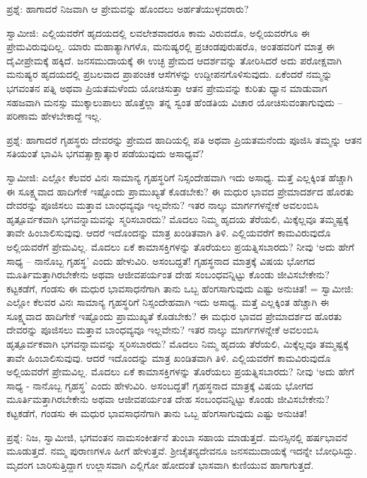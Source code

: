 ಪ್ರಶ್ನೆ: ಹಾಗಾದರೆ ನಿಜವಾಗಿ ಆ ಪ್ರೇಮವನ್ನು ಹೊಂದಲು ಅರ್ಹತೆಯುಳ್ಳವರಾರು?

ಸ್ವಾಮೀಜಿ: ಎಲ್ಲಿಯವರೆಗೆ ಹೃದಯದಲ್ಲಿ ಲವಲೇಶವಾದರೂ ಕಾಮ ವಿರುವದೊ, ಅಲ್ಲಿಯವರೆಗೂ ಈ ಪ್ರೇಮವಿರುವುದಿಲ್ಲ. ಯಾರು ಮಹಾತ್ಯಾಗಿಗಳೊ, ಮನುಷ್ಯರಲ್ಲಿ ಪ್ರಚಂಡಪುರುಷರೊ, ಅಂತಹವರಿಗೆ ಮಾತ್ರ ಈ ದೈವೀಪ್ರೇಮಕ್ಕೆ ಹಕ್ಕಿದೆ. ಜನಸಮುದಾಯಕ್ಕೆ ಈ ಉಚ್ಛ ಪ್ರೇಮದ ಆದರ್ಶವನ್ನು ತೋರಿಸಿದರೆ ಅದು ಪರೋಕ್ಷವಾಗಿ ಮನುಷ್ಯರ ಹೃದಯದಲ್ಲಿ ಪ್ರಬಲವಾದ ಪ್ರಾಪಂಚಿಕ ಆಸೆಗಳನ್ನು ಉದ್ದೀಪನಗೊಳಿಸುವುದು. ಏಕೆಂದರೆ ನಮ್ಮನ್ನು ಭಗವಂತನ ಪತ್ನಿ ಅಥವಾ ಪ್ರಿಯತಮಳೆಂದು ಯೋಚಿಸುತ್ತಾ ಆತನ ಪ್ರೇಮವನ್ನು ಕುರಿತು ಧ್ಯಾನ ಮಾಡುವಾಗ ಸಹಜವಾಗಿ ಮನಸ್ಸು ಮುಕ್ಕಾಲುಪಾಲು ಹೊತ್ತೆಲ್ಲಾ ತನ್ನ ಸ್ವಂತ ಹೆಂಡತಿಯ ವಿಚಾರ ಯೋಚಿಸುವಂತಾಗುವುದು – ಪರಿಣಾಮ ಹೇಳಬೇಕಾದ್ದೆ ಇಲ್ಲ.

ಪ್ರಶ್ನೆ: ಹಾಗಾದರೆ ಗೃಹಸ್ಥರು ದೇವರನ್ನು ಪ್ರೇಮದ ಹಾದಿಯಲ್ಲಿ ಪತಿ ಅಥವಾ ಪ್ರಿಯತಮನೆಂದು ಪೂಜಿಸಿ ತಮ್ಮನ್ನು ಆತನ ಸತಿಯಂತೆ ಭಾವಿಸಿ ಭಗವತ್ಸಾಕ್ಷಾತ್ಕಾರ ಪಡೆಯುವುದು ಅಸಾಧ್ಯವೆ?


ಸ್ವಾಮೀಜಿ: ಎಲ್ಲೋ ಕೆಲವರ ವಿನಃ ಸಾಮಾನ್ಯ ಗೃಹಸ್ಥರಿಗೆ ನಿಸ್ಸಂದೇಹವಾಗಿ ಇದು ಅಸಾಧ್ಯ. ಮತ್ತೆ ಎಲ್ಲಕ್ಕಿಂತ ಹೆಚ್ಚಾಗಿ ಈ ಸೂಕ್ಷ್ಮವಾದ ಹಾದಿಗೇಕೆ ಇಷ್ಟೊಂದು ಪ್ರಾಮುಖ್ಯತೆ ಕೊಡಬೇಕು? ಈ ಮಧುರ ಭಾವದ ಪ್ರೇಮಾದರ್ಶದ ಹೊರತು ದೇವರನ್ನು ಪೂಜಿಸಲು ಮತ್ತಾವ ಬಾಂಧವ್ಯವೂ ಇಲ್ಲವೇನು? ಇತರ ನಾಲ್ಕು ಮಾರ್ಗಗಳನ್ನೇಕೆ ಅವಲಂಬಿಸಿ ಹೃತ್ಪೂರ್ವಕವಾಗಿ ಭಗವನ್ನಾಮವನ್ನು ಸ್ಮರಿಸಬಾರದು? ಮೊದಲು ನಿಮ್ಮ ಹೃದಯ ತೆರೆಯಲಿ, ಮಿಕ್ಕೆಲ್ಲವೂ ತಮ್ಮಷ್ಟಕ್ಕೆ ತಾವೇ ಹಿಂಬಾಲಿಸುವುವು. ಆದರೆ ಇದೊಂದನ್ನು ಮಾತ್ರ ಖಂಡಿತವಾಗಿ ತಿಳಿ. ಎಲ್ಲಿಯವರೆಗೆ ಕಾಮವಿರುವುದೊ ಅಲ್ಲಿಯವರೆಗೆ ಪ್ರೇಮವಿಲ್ಲ. ಮೊದಲು ಏಕೆ ಕಾಮಾಸಕ್ತಿಗಳನ್ನು ತೊರೆಯಲು ಪ್ರಯತ್ನಿಸಬಾರದು? ನೀವು ‘ಅದು ಹೇಗೆ ಸಾಧ್ಯ – ನಾನೊಬ್ಬ ಗೃಹಸ್ಥ’ ಎಂದು ಹೇಳುವಿರಿ. ಅಸಂಬದ್ದತೆ! ಗೃಹಸ್ಥನಾದ ಮಾತ್ರಕ್ಕೆ ವಿಷಯ ಭೋಗದ ಮೂರ್ತಿಮತ್ತಾಗಿರಬೇಕೇನು ಅಥವಾ ಆಜೀವಪರ್ಯಂತ ದೇಹ ಸಂಬಂಧವನ್ನಿಟ್ಟು ಕೊಂಡು ಜೀವಿಸಬೇಕೇನು? ಕಟ್ಟಕಡೆಗೆ, ಗಂಡಸು ಈ ಮಧುರ ಭಾವಸಾಧನೆಗಾಗಿ ತಾನು ಒಬ್ಬ ಹೆಂಗಸಾಗುವುದು ಎಷ್ಟು ಅನುಚಿತ!
=
ಸ್ವಾಮೀಜಿ: ಎಲ್ಲೋ ಕೆಲವರ ವಿನಃ ಸಾಮಾನ್ಯ ಗೃಹಸ್ಥರಿಗೆ ನಿಸ್ಸಂದೇಹವಾಗಿ ಇದು ಅಸಾಧ್ಯ. ಮತ್ತೆ ಎಲ್ಲಕ್ಕಿಂತ ಹೆಚ್ಚಾಗಿ ಈ ಸೂಕ್ಷ್ಮವಾದ ಹಾದಿಗೇಕೆ ಇಷ್ಟೊಂದು ಪ್ರಾಮುಖ್ಯತೆ ಕೊಡಬೇಕು? ಈ ಮಧುರ ಭಾವದ ಪ್ರೇಮಾದರ್ಶದ ಹೊರತು ದೇವರನ್ನು ಪೂಜಿಸಲು ಮತ್ತಾವ ಬಾಂಧವ್ಯವೂ ಇಲ್ಲವೇನು? ಇತರ ನಾಲ್ಕು ಮಾರ್ಗಗಳನ್ನೇಕೆ ಅವಲಂಬಿಸಿ ಹೃತ್ಪೂರ್ವಕವಾಗಿ ಭಗವನ್ನಾಮವನ್ನು ಸ್ಮರಿಸಬಾರದು? ಮೊದಲು ನಿಮ್ಮ ಹೃದಯ ತೆರೆಯಲಿ, ಮಿಕ್ಕೆಲ್ಲವೂ ತಮ್ಮಷ್ಟಕ್ಕೆ ತಾವೇ ಹಿಂಬಾಲಿಸುವುವು. ಆದರೆ ಇದೊಂದನ್ನು ಮಾತ್ರ ಖಂಡಿತವಾಗಿ ತಿಳಿ. ಎಲ್ಲಿಯವರೆಗೆ ಕಾಮವಿರುವುದೊ ಅಲ್ಲಿಯವರೆಗೆ ಪ್ರೇಮವಿಲ್ಲ. ಮೊದಲು ಏಕೆ ಕಾಮಾಸಕ್ತಿಗಳನ್ನು ತೊರೆಯಲು ಪ್ರಯತ್ನಿಸಬಾರದು? ನೀವು ‘ಅದು ಹೇಗೆ ಸಾಧ್ಯ - ನಾನೊಬ್ಬ ಗೃಹಸ್ಥ’ ಎಂದು ಹೇಳುವಿರಿ. ಅಸಂಬದ್ದತೆ! ಗೃಹಸ್ಥನಾದ ಮಾತ್ರಕ್ಕೆ ವಿಷಯ ಭೋಗದ ಮೂರ್ತಿಮತ್ತಾಗಿರಬೇಕೇನು ಅಥವಾ ಆಜೀವಪರ್ಯಂತ ದೇಹ ಸಂಬಂಧವನ್ನಿಟ್ಟು ಕೊಂಡು ಜೀವಿಸಬೇಕೇನು? ಕಟ್ಟಕಡೆಗೆ, ಗಂಡಸು ಈ ಮಧುರ ಭಾವಸಾಧನೆಗಾಗಿ ತಾನು ಒಬ್ಬ ಹೆಂಗಸಾಗುವುದು ಎಷ್ಟು ಅನುಚಿತ!


ಪ್ರಶ್ನೆ: ನಿಜ, ಸ್ವಾಮೀಜಿ, ಭಗವಂತನ ನಾಮಸಂಕೀರ್ತನೆ ತುಂಬಾ ಸಹಾಯ ಮಾಡುತ್ತದೆ. ಮನಸ್ಸಿನಲ್ಲಿ ಹರ್ಷಭಾವನೆ ಮೂಡುತ್ತದೆ. ನಮ್ಮ ಪುರಾಣಗಳೂ ಹೀಗೆ ಹೇಳುತ್ತವೆ. ಶ‍್ರೀಚೈತನ್ಯದೇವನೂ ಜನಸಮುದಾಯಕ್ಕೆ ಇದನ್ನೇ ಬೋಧಿಸಿದ್ದು. ಮೃದಂಗ ಬಾರಿಸುತ್ತಿದ್ದಾಗ ಉಲ್ಲಾಸವಾಗಿ ಎಲ್ಲಿಗೋ ಹೋದಂತೆ ಭಾಸವಾಗಿ ಕುಣಿಯುವ ಹಾಗಾಗುತ್ತದೆ.

